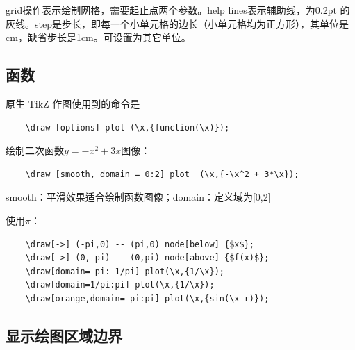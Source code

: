 grid操作表示绘制网格，需要起止点两个参数。help lines表示辅助线，为0.2pt 的灰线。step是步长，即每一个小单元格的边长（小单元格均为正方形），其单位是cm，缺省步长是1cm。可设置为其它单位。

\subsection{函数}

原生 TikZ 作图使用到的命令是
\begin{lstlisting}
    \draw [options] plot (\x,{function(\x)});
\end{lstlisting}

绘制二次函数$y = -x^2 +3x$图像：
\begin{lstlisting}
    \draw [smooth, domain = 0:2] plot  (\x,{-\x^2 + 3*\x});
\end{lstlisting}

smooth：平滑效果适合绘制函数图像；domain：定义域为[0,2]

\begin{center}
    \begin{center}
    \end{center}
\end{center}

使用$\pi$：

\begin{lstlisting}
    \draw[->] (-pi,0) -- (pi,0) node[below] {$x$};
    \draw[->] (0,-pi) -- (0,pi) node[above] {$f(x)$};
    \draw[domain=-pi:-1/pi] plot(\x,{1/\x});
    \draw[domain=1/pi:pi] plot(\x,{1/\x});
    \draw[orange,domain=-pi:pi] plot(\x,{sin(\x r)});
\end{lstlisting}

\begin{center}
\end{center}
\subsection{显示绘图区域边界}

